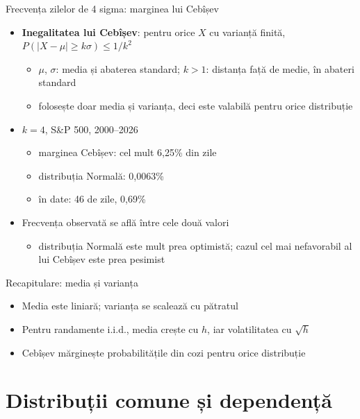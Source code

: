\begin{frame}{Frecvența zilelor de 4 sigma: marginea lui Cebîșev}
\itemsize{\small}
\begin{itemize}
    \item \textbf{Inegalitatea lui Cebîșev}: pentru orice $X$ cu varianță finită, $P(|X - \mu| \ge k\sigma) \le 1/k^2$
    \begin{itemize}
        \item $\mu$, $\sigma$: media și abaterea standard; $k > 1$: distanța față de medie, în abateri standard
        \item folosește doar media și varianța, deci este valabilă pentru orice distribuție
    \end{itemize}
    \item $k = 4$, S\&P 500, 2000--2026
    \begin{itemize}
        \item marginea Cebîșev: cel mult 6{,}25\% din zile
        \item distribuția Normală: 0{,}0063\%
        \item în date: 46 de zile, 0{,}69\%
    \end{itemize}
    \item Frecvența observată se află între cele două valori
    \begin{itemize}
        \item distribuția Normală este mult prea optimistă; cazul cel mai nefavorabil al lui Cebîșev este prea pesimist
    \end{itemize}
\end{itemize}
\end{frame}

\begin{frame}{Recapitulare: media și varianța}
\itemsize{\small}
\begin{itemize}
    \item Media este liniară; varianța se scalează cu pătratul
    \item Pentru randamente i.i.d., media crește cu $h$, iar volatilitatea cu $\sqrt{h}$
    \item Cebîșev mărginește probabilitățile din cozi pentru orice distribuție
\end{itemize}
\end{frame}


\section{Distribuții comune și dependență}

